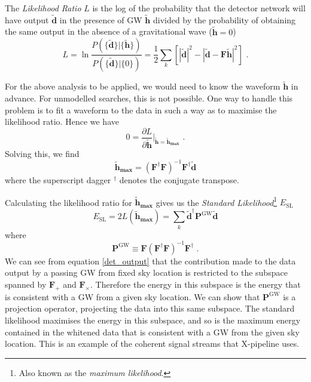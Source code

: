 \documentclass[11pt]{cuthesis}
\newcommand{\fs}{\text{ .}}
\newcommand{\tbd}{\tilde{\textbf{d}}}
\newcommand{\tbh}{\tilde{\textbf{h}}}
\newcommand{\xp}{X-pipeline }
\begin{document}
The \emph{Likelihood Ratio} $L$ is the log of the probability that the detector network will have output $ \tilde{\textbf{d}}$ in the presence of GW $\tbh$  divided by the probability of obtaining the same output in the absence of a gravitational wave ($\tbh=0$)
\begin{equation}
L=\ln \frac{P(\{ \tilde{\textbf{d}} \}|\{ \tilde{\textbf{h}} \})}{P(\{ \tilde{\textbf{d}} \}|\{ 0  \})}= \frac{1}{2} \sum_k \left[ \left| \tbd  \right|^2 - \left| \tbd - \textbf{F} \tbh   \right|^2  \right] \fs
\end{equation}

For the above analysis to be applied, we would need to know the waveform $\tbh$ in advance. For unmodelled searches, this is not possible. One way to handle this problem is to fit a waveform to the data in such a way as to maximise the likelihood ratio. Hence we have
\begin{equation}
0=\frac{\partial L}{\partial \tbh} \bigg|_{\tbh=\tbh_{\textbf{max}}} \fs
\end{equation} 
Solving this, we find
\begin{equation} 
\tbh_\textbf{max}=(\textbf{F}^\dagger \textbf{F} )^{-1} \textbf{F}^\dagger \tbd
\end{equation}
where the superscript dagger $^\dagger$ denotes the conjugate transpose. 

Calculating the likelihood ratio for $\tbh_\textbf{max}$ gives us the \emph{Standard Likelihood}\footnote{Also known as the \textit{maximum likelihood}.} $E_\text{SL}$
\begin{equation} \label{Esl}
E_\text{SL}=2L(\tbh_\textbf{max} )=\sum_k \tbd^\dagger \textbf{P}^\text{GW} \tbd
\end{equation}
where 
\begin{equation} \label{projOp1}
\textbf{P}^\text{GW} \equiv \textbf{F} (\textbf{F}^\dagger \textbf{F})^{-1} \textbf{F}^\dagger \fs
\end{equation}
We can see from equation \ref{det_output} that the contribution made to the data output by a passing GW from fixed sky location is restricted to the subspace spanned by $\textbf{F}_+$ and $\textbf{F}_\times$. Therefore the energy in this subspace is the energy that is consistent with a GW from a given sky location. We can show that $\textbf{P}^\text{GW} $ is a projection operator, projecting the data into this same subspace. The standard likelihood maximises the energy in this subspace, and so is the maximum energy contained in the whitened data that is consistent with a GW from the given sky location. This is an example of the coherent signal streams that \xp uses.
\end{document}
